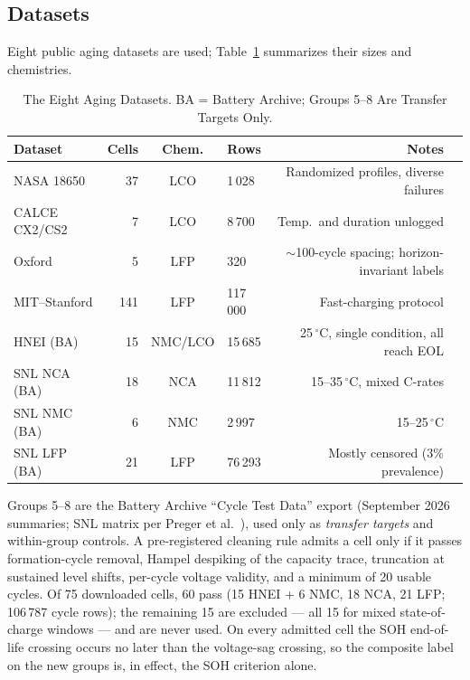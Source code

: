 \documentclass[11pt,a4paper]{article}
\begin{document}
\subsection{Datasets}
Eight public aging datasets are used; Table~\ref{tab:datasets} summarizes their sizes and chemistries.

\begin{table}[!t]
\caption{The Eight Aging Datasets. BA = Battery Archive; Groups 5--8 Are Transfer Targets Only.}
\label{tab:datasets}
\centering
\footnotesize
\begin{tabular}{p{4.2cm}rcp{1.3cm}rp{6.6cm}}
\toprule
\textbf{Dataset} & \textbf{Cells} & \textbf{Chem.} & \textbf{Rows} & \textbf{Notes}\\
\midrule
NASA 18650 \cite{saha2007battery} & 37 & LCO & 1\,028 & Randomized profiles, diverse failures\\
CALCE CX2/CS2 \cite{calce2023battery} & 7 & LCO & 8\,700 & Temp.\ and duration unlogged\\
Oxford \cite{birkl2017oxford} & 5 & LFP & 320 & $\sim$100-cycle spacing; horizon-invariant labels\\
MIT--Stanford \cite{severson2019data,attia2020closedloop} & 141 & LFP & 117\,000 & Fast-charging protocol\\
HNEI (BA) \cite{batteryarchive2023} & 15 & NMC/LCO & 15\,685 & 25\,$^\circ$C, single condition, all reach EOL\\
SNL NCA (BA) \cite{batteryarchive2023,preger2020degradation} & 18 & NCA & 11\,812 & 15--35\,$^\circ$C, mixed C-rates\\
SNL NMC (BA) \cite{batteryarchive2023,preger2020degradation} & 6 & NMC & 2\,997 & 15--25\,$^\circ$C\\
SNL LFP (BA) \cite{batteryarchive2023,preger2020degradation} & 21 & LFP & 76\,293 & Mostly censored (3\% prevalence)\\
\bottomrule
\end{tabular}
\end{table}

Groups 5--8 are the Battery Archive ``Cycle Test Data'' export \cite{batteryarchive2023} (September 2026 summaries; SNL matrix per Preger et al.~\cite{preger2020degradation}), used only as \emph{transfer targets} and within-group controls. A pre-registered cleaning rule admits a cell only if it passes formation-cycle removal, Hampel despiking of the capacity trace, truncation at sustained level shifts, per-cycle voltage validity, and a minimum of 20 usable cycles. Of 75 downloaded cells, 60 pass (15 HNEI + 6 NMC, 18 NCA, 21 LFP; 106\,787 cycle rows); the remaining 15 are excluded --- all 15 for mixed state-of-charge windows --- and are never used. On every admitted cell the SOH end-of-life crossing occurs no later than the voltage-sag crossing, so the composite label on the new groups is, in effect, the SOH criterion alone.
\end{document}
